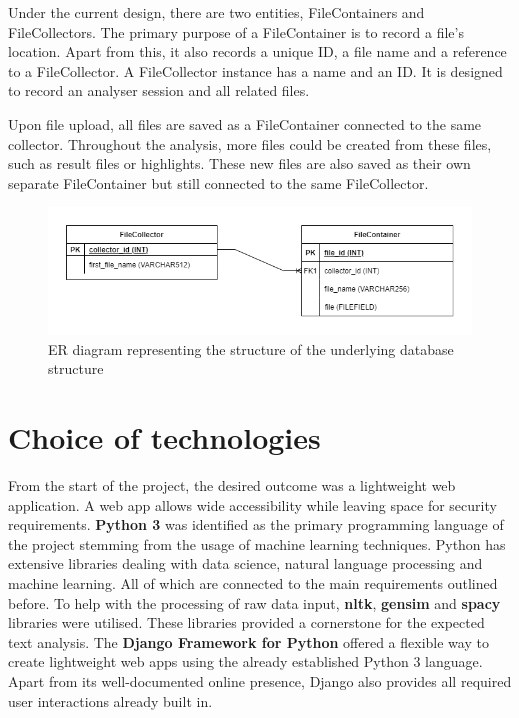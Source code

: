 \documentclass{l4proj}
\begin{document}
Under the current design, there are two entities, FileContainers and FileCollectors. The primary purpose of a FileContainer is to record a file's location. Apart from this, it also records a unique ID, a file name and a reference to a FileCollector. A FileCollector instance has a name and an ID. It is designed to record an analyser session and all related files.

Upon file upload, all files are saved as a FileContainer connected to the same collector. Throughout the analysis, more files could be created from these files, such as result files or highlights. These new files are also saved as their own separate FileContainer but still connected to the same FileCollector. 

\begin{figure}[H]
    \centering
    \includegraphics[width=1\linewidth]{images/mlqda_db.drawio.png}    
    \caption{ER diagram representing the structure of the underlying database structure}
    \label{fig:mlqda-ER-diagram} 
\end{figure}



\section{Choice of technologies}

From the start of the project, the desired outcome was a lightweight web application. A web app allows wide accessibility while leaving space for security requirements. \textbf{Python 3} was identified as the primary programming language of the project stemming from the usage of machine learning techniques. Python has extensive libraries dealing with data science, natural language processing and machine learning. All of which are connected to the main requirements outlined before. To help with the processing of raw data input, \textbf{nltk}, \textbf{gensim} and \textbf{spacy} libraries were utilised. These libraries provided a cornerstone for the expected text analysis. The \textbf{Django Framework for Python} offered a flexible way to create lightweight web apps using the already established Python 3 language. Apart from its well-documented online presence, Django also provides all required user interactions already built in.
\end{document}
